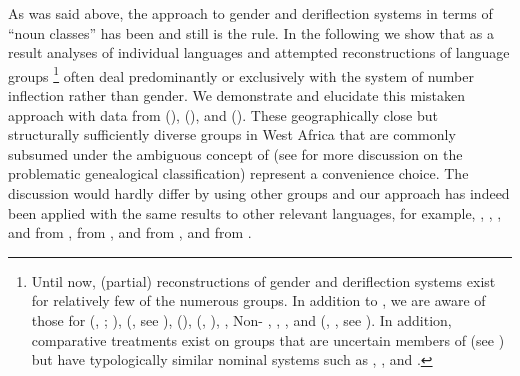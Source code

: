 \documentclass[output=collectionpaper]{langsci/langscibook}
\begin{document}
As was said above, the approach to  gender and deriflection systems in terms of ``noun classes'' has been and still is the rule. In the following we show that as a result analyses of individual languages and attempted reconstructions of language groups%
\footnote{Until now, (partial) reconstructions of gender and deriflection systems exist for relatively few of the numerous  groups. In addition to , we are aware of those for  (\citealt{Manessy1967}, \citeyear{Manessy1975}; \citealt{Miehe2012}),  (\citealt{Heine1968}, see ),  (\citealt{DeWolf1971}),  (\citealt{Bokula1971}, \citealt{Pasch1986}),  \citep{Doneux1975}, Non-  \citep{Hyman1980},  \citep{Elugbe1983},  \citep{Connell1987}, and  (\citealt{Manessy1987}, \citealt{Snider1988}, see ). In addition, comparative treatments exist on groups that are uncertain members of  (see \citealt{Gueldemann2018}) but have typologically similar nominal systems such as  \citep{Schadeberg1981a},  \citep{Schadeberg1981b}, and  \citep{Marchese1988}.} %
often deal predominantly or exclusively with the system of number inflection rather than gender. We demonstrate and elucidate this mistaken approach with data from  (),  (), and  (). These geographically close but structurally sufficiently diverse  groups in West Africa that are commonly subsumed under the ambiguous concept of  (see \citealt{Gueldemann2018} for more discussion on the problematic genealogical classification) represent a convenience choice. The discussion would hardly differ by using other  groups and our approach has indeed been applied with the same results to other relevant languages, for example, , , , and  from ,  from ,  and  from , and  from .
\end{document}
